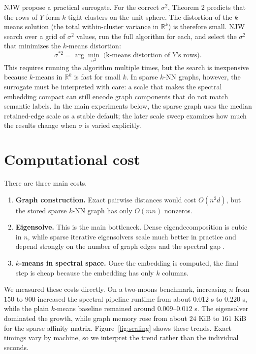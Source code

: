 \documentclass[11pt]{article}
\theoremstyle{plain}
\theoremstyle{definition}
\begin{document}
NJW propose a practical surrogate. For the correct $\sigma^2$, Theorem 2 predicts that the rows of $Y$ form $k$ tight clusters on the unit sphere. The distortion of the $k$-means solution (the total within-cluster variance in $\mathbb{R}^k$) is therefore small. NJW search over a grid of $\sigma^2$ values, run the full algorithm for each, and select the $\sigma^2$ that minimizes the $k$-means distortion:
\begin{equation}
    \sigma^{*2} = \arg\min_{\sigma^2}\; \text{(k-means distortion of } Y\text{'s rows)}.
    \label{eq:sigma_search}
\end{equation}
This requires running the algorithm multiple times, but the search is inexpensive because $k$-means in $\mathbb{R}^k$ is fast for small $k$. In sparse $k$-NN graphs, however, the surrogate must be interpreted with care: a scale that makes the spectral embedding compact can still encode graph components that do not match semantic labels. In the main experiments below, the sparse graph uses the median retained-edge scale as a stable default; the later scale sweep examines how much the results change when $\sigma$ is varied explicitly.



\section{Computational cost}
There are three main costs.
\begin{enumerate}[leftmargin=1.4em]
    \item \textbf{Graph construction.} Exact pairwise distances would cost $O(n^2d)$, but the stored sparse $k$-NN graph has only $O(mn)$ nonzeros.
    \item \textbf{Eigensolve.} This is the main bottleneck. Dense eigendecomposition is cubic in $n$, while sparse iterative eigensolvers scale much better in practice and depend strongly on the number of graph edges and the spectral gap \cite{vonluxburg2007tutorial,ng2001spectral}.
    \item \textbf{$k$-means in spectral space.} Once the embedding is computed, the final step is cheap because the embedding has only $k$ columns.
\end{enumerate}

We measured these costs directly. On a two-moons benchmark, increasing $n$ from $150$ to $900$ increased the spectral pipeline runtime from about $0.012$ s to $0.220$ s, while the plain $k$-means baseline remained around $0.009$--$0.012$ s. The eigensolver dominated the growth, while graph memory rose from about $24$ KiB to $161$ KiB for the sparse affinity matrix. Figure~\ref{fig:scaling} shows these trends. Exact timings vary by machine, so we interpret the trend rather than the individual seconds.
\end{document}
